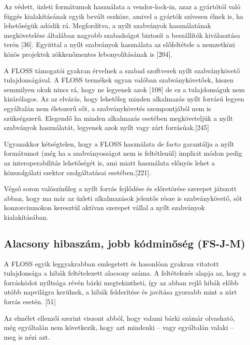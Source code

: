 \documentclass[12pt,magyar,a4paper,oneside]{scrreprt}
\begin{document}
Az védett, üzleti formátumok használata a vendor-lock-in, azaz a
gyártótól való függés kialakításának egyik bevált eszköze, amivel a
gyártók szívesen élnek is, ha lehetőségük adódik rá. Megfordítva, a
nyílt szabványok használatának megkövetelése általában nagyobb
szabadságot biztosít a beszállítók kiválasztása terén {[}36{]}. Egyúttal
a nyílt szabványok használata az előfeltétele a nemzetközi közös
projektek zökkenőmentes lebonyolításának is {[}204{]}.

A FLOSS támogatói gyakran érvelnek a szabad szoftverek nyílt
szabványkövető tulajdonságával. A FLOSS termékek ugyan valóban
szabványkövetőek, hiszen semmilyen okuk nincs rá, hogy ne legyenek azok
{[}108{]} de ez a tulajdonságuk nem kizárólagos. Az az elvárás, hogy
lehetőleg minden alkalmazás nyílt forrású legyen egyáltalán nem
életszerű sőt, a szabványkövetés szempontjából nem is szükségszerű.
Elegendő ha minden alkalmazás esetében megköveteljük a nyílt szabványok
használatát, legyenek azok nyílt vagy zárt forrásúak.{[}245{]}

Ugyanakkor kétségtelen, hogy a FLOSS használata de facto garantálja a
nyílt formátumot (még ha a szabványosságot nem is feltétlenül) implicit
módon pedig az interoperabilitás lehetőségét is, ami miatt használata
előnyös lehet a közszolgálati szektor szolgáltatásai esetében.{[}221{]}.

Végső soron valószínűleg a nyílt forrás fejlődése és előretörése
szerepet játszott abban, hogy ma már az üzleti alkalmazások jelentős
része is szabványkövető, sőt konzorciumokon keresztül aktívan szerepet
vállal a nyílt szabványok kialakításában.

\hypertarget{sec:FS-J-M}{%
\subsection{Alacsony hibaszám, jobb kódminőség
(FS-J-M)}\label{sec:FS-J-M}}

A FLOSS egyik leggyakrabban emlegetett és hasonlóan gyakran vitatott
tulajdonsága a hibák feltételezett alacsony száma. A feltételezés alapja
az, hogy a forráskódot nyíltsága révén bárki megtekintheti, így az abban
rejlő hibák előbb utóbb napvilágra kerülnek, a hibák felderítése és
javítása gyorsabb mint a zárt forrás esetén. {[}51{]}

Az elmélet ellenzői szerint viszont abból, hogy valami bárki számár
olvasható, még egyáltalán nem következik, hogy azt mindenki -- vagy
egyáltalán valaki -- meg is nézi azt.
\end{document}
